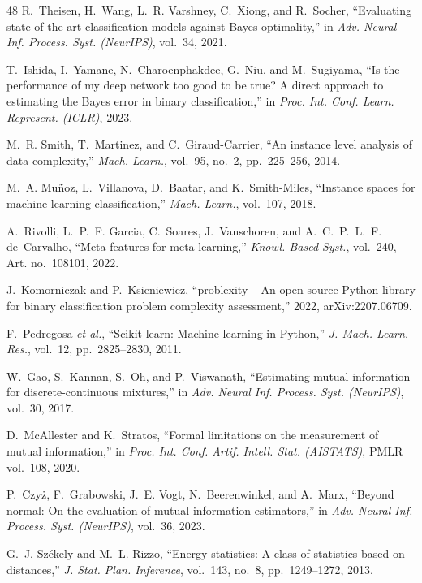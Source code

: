 \begin{thebibliography}{48}
R.~Theisen, H.~Wang, L.~R. Varshney, C.~Xiong, and R.~Socher, ``Evaluating state-of-the-art classification models against Bayes optimality,'' in \emph{Adv. Neural Inf. Process. Syst. (NeurIPS)}, vol.~34, 2021.

T.~Ishida, I.~Yamane, N.~Charoenphakdee, G.~Niu, and M.~Sugiyama, ``Is the performance of my deep network too good to be true? A direct approach to estimating the Bayes error in binary classification,'' in \emph{Proc. Int. Conf. Learn. Represent. (ICLR)}, 2023.

M.~R. Smith, T.~Martinez, and C.~Giraud-Carrier, ``An instance level analysis of data complexity,'' \emph{Mach. Learn.}, vol.~95, no.~2, pp.~225--256, 2014.

M.~A. Mu\~{n}oz, L.~Villanova, D.~Baatar, and K.~Smith-Miles, ``Instance spaces for machine learning classification,'' \emph{Mach. Learn.}, vol.~107, 2018.

A.~Rivolli, L.~P.~F. Garcia, C.~Soares, J.~Vanschoren, and A.~C.~P.~L.~F. de~Carvalho, ``Meta-features for meta-learning,'' \emph{Knowl.-Based Syst.}, vol.~240, Art. no.~108101, 2022.

J.~Komorniczak and P.~Ksieniewicz, ``problexity -- An open-source Python library for binary classification problem complexity assessment,'' 2022, arXiv:2207.06709.

F.~Pedregosa \emph{et al.}, ``Scikit-learn: Machine learning in Python,'' \emph{J. Mach. Learn. Res.}, vol.~12, pp.~2825--2830, 2011.

W.~Gao, S.~Kannan, S.~Oh, and P.~Viswanath, ``Estimating mutual information for discrete-continuous mixtures,'' in \emph{Adv. Neural Inf. Process. Syst. (NeurIPS)}, vol.~30, 2017.

D.~McAllester and K.~Stratos, ``Formal limitations on the measurement of mutual information,'' in \emph{Proc. Int. Conf. Artif. Intell. Stat. (AISTATS)}, PMLR vol.~108, 2020.

P.~Czy\.{z}, F.~Grabowski, J.~E. Vogt, N.~Beerenwinkel, and A.~Marx, ``Beyond normal: On the evaluation of mutual information estimators,'' in \emph{Adv. Neural Inf. Process. Syst. (NeurIPS)}, vol.~36, 2023.

G.~J. Sz\'{e}kely and M.~L. Rizzo, ``Energy statistics: A class of statistics based on distances,'' \emph{J. Stat. Plan. Inference}, vol.~143, no.~8, pp.~1249--1272, 2013.


\end{thebibliography}

